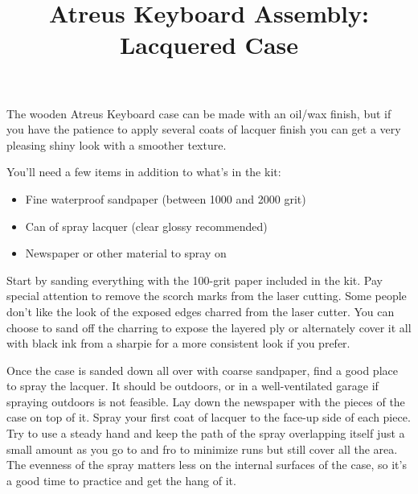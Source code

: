 \documentclass{article}
\title{Atreus Keyboard Assembly: Lacquered Case}
\date{ }
\begin{document}
\maketitle
\vspace{-3em}

The wooden Atreus Keyboard case can be made with an oil/wax finish,
but if you have the patience to apply several coats of lacquer finish
you can get a very pleasing shiny look with a smoother texture.

\vspace{1em}
\noindent{}
\vspace{1em}

You'll need a few items in addition to what's in the kit:

\begin{itemize}
\item Fine waterproof sandpaper (between 1000 and 2000 grit)
\item Can of spray lacquer (clear glossy recommended)
\item Newspaper or other material to spray on
\end{itemize}

Start by sanding everything with the 100-grit paper included in the
kit. Pay special attention to remove the scorch marks from the laser
cutting. Some people don't like the look of the exposed edges charred
from the laser cutter. You can choose to sand off the charring to
expose the layered ply or alternately cover it all with black ink from
a sharpie for a more consistent look if you prefer.

Once the case is sanded down all over with coarse sandpaper, find a
good place to spray the lacquer. It should be outdoors, or in a
well-ventilated garage if spraying outdoors is not feasible. Lay down
the newspaper with the pieces of the case on top of it. Spray your
first coat of lacquer to the face-up side of each piece. Try to use a
steady hand and keep the path of the spray overlapping itself just a
small amount as you go to and fro to minimize runs but still cover all
the area. The evenness of the spray matters less on the internal
surfaces of the case, so it's a good time to practice and get the hang
of it.
\end{document}
